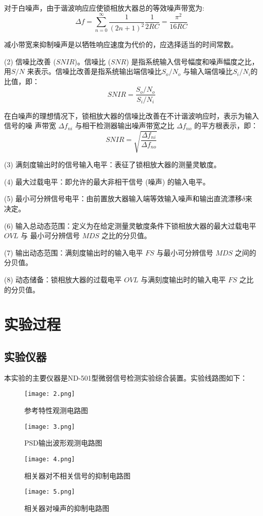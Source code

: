 \documentclass{whureport}
\begin{document}
\begin{multicols}{2}
对于白噪声，由于谐波响应应使锁相放大器总的等效噪声带宽为:
\begin{equation}
    \Delta f = \sum_{n=0}^{\infty} \frac{1}{(2n+1)^2} \frac{1}{2RC} = \frac{\pi^2}{16RC}
\end{equation}

减小带宽来抑制噪声是以牺牲响应速度为代价的，应选择适当的时间常数。

(2) 信噪比改善 ($SNIR$)。信噪比 ($SNR$) 是指系统输入信号幅度和噪声幅度之比，用$S/N$
来表示。信噪比改善是指系统输出端信噪比$S_o / N_o$ 与输入端信噪比$S_i / N_i$的比值，即：
\begin{equation}
    SNIR = \frac{S_o / N_o}{S_i / N_i}
\end{equation}

在白噪声的理想情况下，锁相放大器的信噪比改善在不计谐波响应时，表示为输入信号的噪
声带宽 $\Delta f_{ni}$ 与相干检测器输出噪声带宽之比 $\Delta f_{no}$ 的平方根表示，即：
\begin{equation}
    SNIR = \sqrt{\frac{\Delta f_{ni}}{\Delta f_{no}}}
\end{equation}

(3) 满刻度输出时的信号输入电平：表征了锁相放大器的测量灵敏度。

(4) 最大过载电平：即允许的最大非相干信号 (噪声) 的输入电平。

(5) 最小可分辨信号电平：由前置放大器输入端等效输入噪声和输出直流漂移$\delta$来决定。

(6) 输入总动态范围：定义为在给定测量灵敏度条件下锁相放大器的最大过载电平 $OVL$ 与
    最小可分辨信号 $MDS$ 之比的分贝值。

(7) 输出动态范围：满刻度输出时的输入电平 $FS$ 与最小可分辨信号 $MDS$ 之间的分贝值。

(8) 动态储备：锁相放大器的过载电平 $OVL$ 与满刻度输出时的输入电平 $FS$ 之比的分贝值。
\section{实验过程}
\subsection{实验仪器}
本实验的主要仪器是ND-501型微弱信号检测实验综合装置。实验线路图如下：
\begin{figure}[H]
	\centering
	\texttt{[image: 2.png]}
	\caption{参考特性观测电路图}	
	\label{circuit1}
\end{figure}
\begin{figure}[H]
	\centering
	\texttt{[image: 3.png]}
	\caption{PSD输出波形观测电路图}
	\label{circuit2}
\end{figure}
\begin{figure}[H]
	\centering
	\texttt{[image: 4.png]}
	\caption{相关器对不相关信号的抑制电路图}
	\label{circuit3}
\end{figure}
\begin{figure}[H]
	\centering
	\texttt{[image: 5.png]}
	\caption{相关器对噪声的抑制电路图}
	\label{circuit4}
\end{figure}


\end{multicols}
\end{document}
